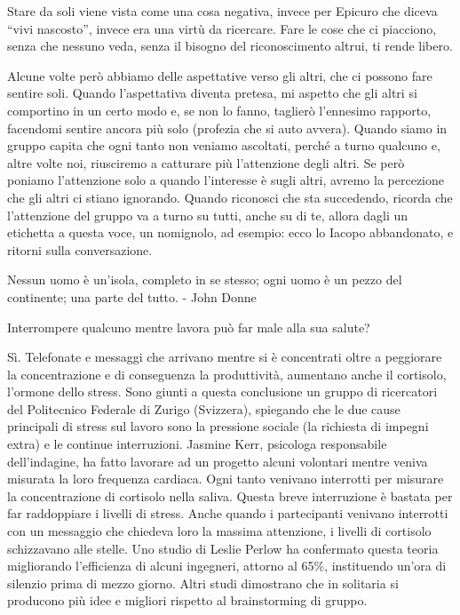 \documentclass[12pt]{book} %
\begin{document}
Stare da soli viene vista come una cosa negativa, invece per Epicuro che diceva “vivi nascosto”, invece era una virtù da
ricercare. Fare le cose che ci piacciono, senza che nessuno veda, senza il bisogno del riconoscimento altrui, ti rende
libero.

Alcune volte però abbiamo delle aspettative verso gli altri, che ci possono fare sentire soli. Quando
l'aspettativa diventa pretesa, mi aspetto che gli altri si comportino in un certo modo e, se non
lo fanno, taglierò l'ennesimo rapporto, facendomi sentire ancora più solo (profezia che si auto avvera). Quando siamo
in gruppo capita che ogni tanto non veniamo ascoltati, perché a turno qualcuno e, altre volte noi, riusciremo a
catturare più l'attenzione degli altri. Se però poniamo l'attenzione solo a
quando l'interesse è sugli altri, avremo la percezione che gli altri ci stiano ignorando. Quando
riconosci che sta succedendo, ricorda che l'attenzione del gruppo va a turno su tutti, anche su di
te, allora dagli un etichetta a questa voce, un nomignolo, ad esempio: ecco lo Iacopo abbandonato, e ritorni sulla
conversazione.


\bigskip

{\textquotedbl}Nessun uomo è un'isola, completo in se stesso; ogni uomo è un pezzo del continente; una parte del
tutto.{\textquotedbl} - John Donne 


\bigskip
\begin{mdframed}[linewidth=1pt]
Interrompere qualcuno mentre lavora può far male alla sua salute?

Sì. Telefonate e messaggi che arrivano mentre si è concentrati oltre a peggiorare la concentrazione e di conseguenza la
produttività, aumentano anche il cortisolo, l'ormone dello stress. Sono giunti a questa conclusione un gruppo di
ricercatori del Politecnico Federale di Zurigo (Svizzera), spiegando che le due cause principali di stress sul lavoro
sono la pressione sociale (la richiesta di impegni extra) e le continue interruzioni. Jasmine Kerr, psicologa
responsabile dell'indagine, ha fatto lavorare ad un progetto alcuni volontari mentre veniva misurata la loro frequenza
cardiaca. Ogni tanto venivano interrotti per misurare la concentrazione di cortisolo nella saliva. Questa breve
interruzione è bastata per far raddoppiare i livelli di stress. Anche quando i partecipanti venivano interrotti con un
messaggio che chiedeva loro la massima attenzione, i livelli di cortisolo schizzavano alle stelle. Uno studio di Leslie
Perlow ha confermato questa teoria migliorando l'efficienza di alcuni ingegneri, attorno al 65\%, instituendo
un'ora di silenzio prima di mezzo giorno. Altri studi dimostrano che in solitaria si producono più
idee e migliori rispetto al brainstorming di gruppo.
\end{mdframed}
\end{document}
